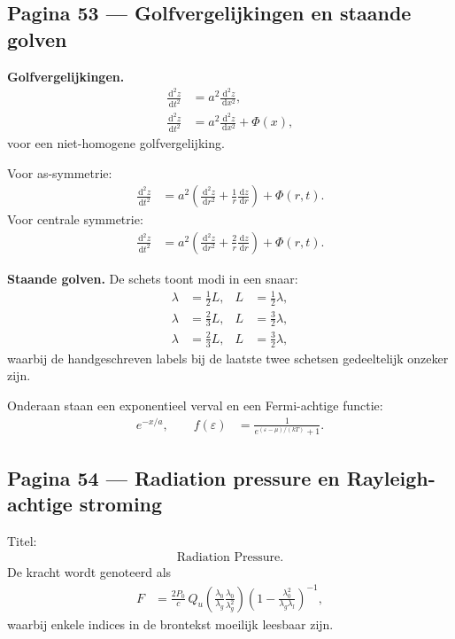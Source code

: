 \documentclass[11pt]{article}
\newcommand{\dd}{\,\mathrm{d}}
\newcommand{\onzeker}[1]{\textcolor{red!70!black}{#1}}
\begin{document}
\subsection*{Pagina 53 --- Golfvergelijkingen en staande golven}

\textbf{Golfvergelijkingen.}
\begin{align*}
\frac{\dd^2 z}{\dd t^2}
  &= a^2\frac{\dd^2 z}{\dd x^2},\\
\frac{\dd^2 z}{\dd t^2}
  &= a^2\frac{\dd^2 z}{\dd x^2}+\Phi(x),
\end{align*}
voor een niet-homogene golfvergelijking.

Voor as-symmetrie:
\begin{align*}
\frac{\dd^2 z}{\dd t^2}
&=
a^2\left(
\frac{\dd^2 z}{\dd r^2}
+
\frac{1}{r}\frac{\dd z}{\dd r}
\right)
+\Phi(r,t).
\end{align*}
Voor centrale symmetrie:
\begin{align*}
\frac{\dd^2 z}{\dd t^2}
&=
a^2\left(
\frac{\dd^2 z}{\dd r^2}
+
\frac{2}{r}\frac{\dd z}{\dd r}
\right)
+\Phi(r,t).
\end{align*}

\textbf{Staande golven.}
De schets toont modi in een snaar:
\begin{align*}
\lambda&=\frac{1}{2}L,&
L&=\frac{1}{2}\lambda,\\
\lambda&=\frac{2}{3}L,&
L&=\frac{3}{2}\lambda,\\
\lambda&=\frac{2}{3}L,&
L&=\frac{3}{2}\lambda,
\end{align*}
waarbij de handgeschreven labels bij de laatste twee schetsen \onzeker{gedeeltelijk onzeker} zijn.

Onderaan staan een exponentieel verval en een Fermi-achtige functie:
\begin{align*}
e^{-x/a},
\qquad
f(\varepsilon)
&=
\frac{1}{e^{(\varepsilon-\mu)/(kT)}+1}.
\end{align*}

\subsection*{Pagina 54 --- Radiation pressure en Rayleigh-achtige stroming}

Titel:
\begin{align*}
\text{Radiation Pressure}.
\end{align*}
De kracht wordt genoteerd als
\begin{align*}
F
&=
\frac{2P_0}{c}\,Q_u
\left(
\frac{\lambda_0}{\lambda_g}
\frac{\lambda_0}{\lambda_g^2}
\right)
\left(
1-\frac{\lambda_0^2}{\lambda_g\lambda_l}
\right)^{-1},
\end{align*}
waarbij enkele indices in de brontekst moeilijk leesbaar zijn.
\end{document}
